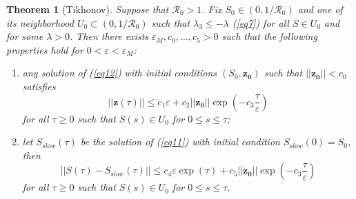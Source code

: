 \documentclass[11pt,reqno]{amsart}
\newtheorem{theorem}{Theorem}
\theoremstyle{boldremark}
\begin{document}
\begin{theorem} [Tikhonov] \label{teo3}
    Suppose that $\mathcal{R}_0>1$. Fix $S_0 \in (0, 1/\mathcal{R}_0)$ and one of its neighborhood $U_0 \subset (0,1/\mathcal{R}_0)$ such that $\lambda_3 \le -\lambda$ (\ref{eq7}) for all $S \in U_0$ and for some $\lambda>0$. Then there exists $\varepsilon_M, c_0, \dots, c_5>0$ such that the following properties hold for $0<\varepsilon < \varepsilon_M$: 
    \begin{enumerate}
        \item any solution of (\ref{eq12}) with initial conditions $(S_0, \mathbf{z_0})$ such that $||\mathbf{z_0}||<c_0$ satisfies 
        \begin{equation} \label{eq122}
            ||\mathbf{z}(\tau)|| \le c_1 \varepsilon + c_2 ||\mathbf{z_0}|| \exp\left(-c_3 \frac{\tau}{\varepsilon}\right) 
        \end{equation}
        for all $\tau \ge 0$ such that $S(s) \in U_0$ for $0 \le s \le \tau$; 
        \item let $S_{slow}(\tau)$ be the solution of (\ref{eq11}) with initial condition $S_{slow}(0)=S_0$, then 
        \begin{equation} \label{eq13}
            ||S(\tau)-S_{slow}(\tau)|| \le c_4 \varepsilon \exp(\tau) + c_5 ||\mathbf{z_0}|| \exp\left(-c_3 \frac{\tau}{\varepsilon}\right)
        \end{equation}
        for all $\tau \ge 0$ such that $S(s)\in U_0$ for $0 \le s \le \tau$. 
    \end{enumerate}
\end{theorem}
\end{document}
